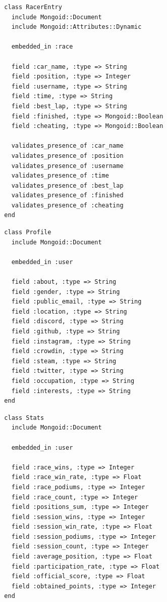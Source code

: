 \begin{listing}
  \begin{verbatim}
  class RacerEntry
    include Mongoid::Document
    include Mongoid::Attributes::Dynamic
    
    embedded_in :race
    
    field :car_name, :type => String
    field :position, :type => Integer
    field :username, :type => String
    field :time, :type => String
    field :best_lap, :type => String
    field :finished, :type => Mongoid::Boolean
    field :cheating, :type => Mongoid::Boolean
    
    validates_presence_of :car_name
    validates_presence_of :position
    validates_presence_of :username
    validates_presence_of :time
    validates_presence_of :best_lap
    validates_presence_of :finished
    validates_presence_of :cheating
  end
  \end{verbatim}
\end{listing}

\begin{listing}
  \begin{verbatim}
  class Profile
    include Mongoid::Document
    
    embedded_in :user
    
    field :about, :type => String
    field :gender, :type => String
    field :public_email, :type => String
    field :location, :type => String
    field :discord, :type => String
    field :github, :type => String
    field :instagram, :type => String
    field :crowdin, :type => String
    field :steam, :type => String
    field :twitter, :type => String
    field :occupation, :type => String
    field :interests, :type => String
  end
  \end{verbatim}
\end{listing}

\begin{listing}
  \begin{verbatim}
  class Stats
    include Mongoid::Document
    
    embedded_in :user
    
    field :race_wins, :type => Integer
    field :race_win_rate, :type => Float
    field :race_podiums, :type => Integer
    field :race_count, :type => Integer
    field :positions_sum, :type => Integer
    field :session_wins, :type => Integer
    field :session_win_rate, :type => Float
    field :session_podiums, :type => Integer
    field :session_count, :type => Integer
    field :average_position, :type => Float
    field :participation_rate, :type => Float
    field :official_score, :type => Float
    field :obtained_points, :type => Integer
  end
  \end{verbatim}
\end{listing}

